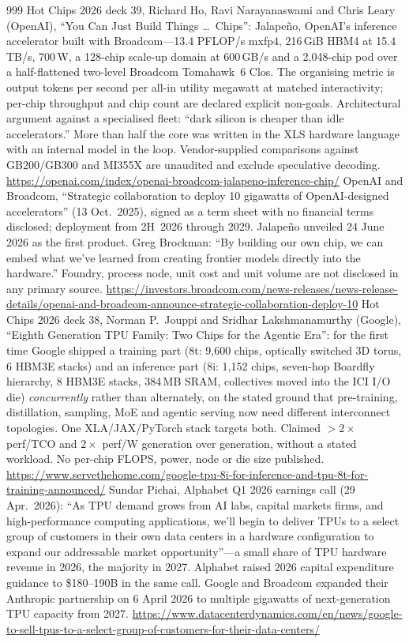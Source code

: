 \begin{thebibliography}{999}
 Hot Chips 2026 deck 39, Richard Ho, Ravi Narayanaswami and Chris Leary (OpenAI), ``You Can Just Build Things \ldots\ Chips'': Jalape\~no, OpenAI's inference accelerator built with Broadcom---13.4 PFLOP/s mxfp4, 216\,GiB HBM4 at 15.4\,TB/s, 700\,W, a 128-chip scale-up domain at 600\,GB/s and a 2{,}048-chip pod over a half-flattened two-level Broadcom Tomahawk~6 Clos. The organising metric is output tokens per second per all-in utility megawatt at matched interactivity; per-chip throughput and chip count are declared explicit non-goals. Architectural argument against a specialised fleet: ``dark silicon is cheaper than idle accelerators.'' More than half the core was written in the XLS hardware language with an internal model in the loop. Vendor-supplied comparisons against GB200/GB300 and MI355X are unaudited and exclude speculative decoding. \url{https://openai.com/index/openai-broadcom-jalapeno-inference-chip/}
 OpenAI and Broadcom, ``Strategic collaboration to deploy 10 gigawatts of OpenAI-designed accelerators'' (13 Oct.\ 2025), signed as a term sheet with no financial terms disclosed; deployment from 2H~2026 through 2029. Jalape\~no unveiled 24 June 2026 as the first product. Greg Brockman: ``By building our own chip, we can embed what we've learned from creating frontier models directly into the hardware.'' Foundry, process node, unit cost and unit volume are not disclosed in any primary source. \url{https://investors.broadcom.com/news-releases/news-release-details/openai-and-broadcom-announce-strategic-collaboration-deploy-10}
 Hot Chips 2026 deck 38, Norman P.\ Jouppi and Sridhar Lakshmanamurthy (Google), ``Eighth Generation TPU Family: Two Chips for the Agentic Era'': for the first time Google shipped a training part (8t: 9{,}600 chips, optically switched 3D torus, 6 HBM3E stacks) and an inference part (8i: 1{,}152 chips, seven-hop Boardfly hierarchy, 8 HBM3E stacks, 384\,MB SRAM, collectives moved into the ICI I/O die) \emph{concurrently} rather than alternately, on the stated ground that pre-training, distillation, sampling, MoE and agentic serving now need different interconnect topologies. One XLA/JAX/PyTorch stack targets both. Claimed $>2\times$ perf/TCO and $2\times$ perf/W generation over generation, without a stated workload. No per-chip FLOPS, power, node or die size published. \url{https://www.servethehome.com/google-tpu-8i-for-inference-and-tpu-8t-for-training-announced/}
 Sundar Pichai, Alphabet Q1 2026 earnings call (29 Apr.\ 2026): ``As TPU demand grows from AI labs, capital markets firms, and high-performance computing applications, we'll begin to deliver TPUs to a select group of customers in their own data centers in a hardware configuration to expand our addressable market opportunity''---a small share of TPU hardware revenue in 2026, the majority in 2027. Alphabet raised 2026 capital expenditure guidance to \$180--190B in the same call. Google and Broadcom expanded their Anthropic partnership on 6 April 2026 to multiple gigawatts of next-generation TPU capacity from 2027. \url{https://www.datacenterdynamics.com/en/news/google-to-sell-tpus-to-a-select-group-of-customers-for-their-data-centers/}

\end{thebibliography}
